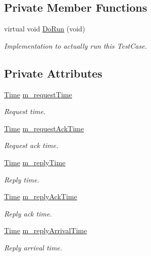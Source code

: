 \subsection*{Private Member Functions}
\begin{DoxyCompactItemize}
\item 
virtual void \hyperlink{classLrWpanAckTestCase_a44ec9b782ae2c74d8fa2a25d696833e9}{Do\+Run} (void)
\begin{DoxyCompactList}\small\item\em Implementation to actually run this Test\+Case. \end{DoxyCompactList}\end{DoxyCompactItemize}
\subsection*{Private Attributes}
\begin{DoxyCompactItemize}
\item 
\hyperlink{classns3_1_1Time}{Time} \hyperlink{classLrWpanAckTestCase_a18aeb3f02f751869c6a9f40f419da003}{m\+\_\+request\+Time}
\begin{DoxyCompactList}\small\item\em Request time. \end{DoxyCompactList}\item 
\hyperlink{classns3_1_1Time}{Time} \hyperlink{classLrWpanAckTestCase_a3cae2bf67eb3227a831d7b3f64c38027}{m\+\_\+request\+Ack\+Time}
\begin{DoxyCompactList}\small\item\em Request ack time. \end{DoxyCompactList}\item 
\hyperlink{classns3_1_1Time}{Time} \hyperlink{classLrWpanAckTestCase_a1c185cc47cafba81b7f2b00ed2d22b5f}{m\+\_\+reply\+Time}
\begin{DoxyCompactList}\small\item\em Reply time. \end{DoxyCompactList}\item 
\hyperlink{classns3_1_1Time}{Time} \hyperlink{classLrWpanAckTestCase_ae34a3c8910c08e9442e258e35fd3930f}{m\+\_\+reply\+Ack\+Time}
\begin{DoxyCompactList}\small\item\em Reply ack time. \end{DoxyCompactList}\item 
\hyperlink{classns3_1_1Time}{Time} \hyperlink{classLrWpanAckTestCase_af07e2f06722c98c42d0ffa89b2be052c}{m\+\_\+reply\+Arrival\+Time}
\begin{DoxyCompactList}\small\item\em Reply arrival time. \end{DoxyCompactList}\end{DoxyCompactItemize}
